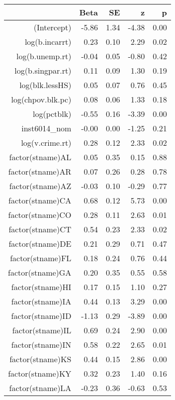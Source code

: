 \begin{table}[ht]
\centering
\begin{tabular}{rrrrr}
  \hline
 & Beta & SE & z & p \\ 
  \hline
(Intercept) & -5.86 & 1.34 & -4.38 & 0.00 \\ 
  log(b.incarrt) & 0.23 & 0.10 & 2.29 & 0.02 \\ 
  log(b.unemp.rt) & -0.04 & 0.05 & -0.80 & 0.42 \\ 
  log(b.singpar.rt) & 0.11 & 0.09 & 1.30 & 0.19 \\ 
  log(blk.lessHS) & 0.05 & 0.07 & 0.76 & 0.45 \\ 
  log(chpov.blk.pc) & 0.08 & 0.06 & 1.33 & 0.18 \\ 
  log(pctblk) & -0.55 & 0.16 & -3.39 & 0.00 \\ 
  inst6014\_nom & -0.00 & 0.00 & -1.25 & 0.21 \\ 
  log(v.crime.rt) & 0.28 & 0.12 & 2.33 & 0.02 \\ 
  factor(stname)AL & 0.05 & 0.35 & 0.15 & 0.88 \\ 
  factor(stname)AR & 0.07 & 0.26 & 0.28 & 0.78 \\ 
  factor(stname)AZ & -0.03 & 0.10 & -0.29 & 0.77 \\ 
  factor(stname)CA & 0.68 & 0.12 & 5.73 & 0.00 \\ 
  factor(stname)CO & 0.28 & 0.11 & 2.63 & 0.01 \\ 
  factor(stname)CT & 0.54 & 0.23 & 2.33 & 0.02 \\ 
  factor(stname)DE & 0.21 & 0.29 & 0.71 & 0.47 \\ 
  factor(stname)FL & 0.18 & 0.24 & 0.76 & 0.44 \\ 
  factor(stname)GA & 0.20 & 0.35 & 0.55 & 0.58 \\ 
  factor(stname)HI & 0.17 & 0.15 & 1.10 & 0.27 \\ 
  factor(stname)IA & 0.44 & 0.13 & 3.29 & 0.00 \\ 
  factor(stname)ID & -1.13 & 0.29 & -3.89 & 0.00 \\ 
  factor(stname)IL & 0.69 & 0.24 & 2.90 & 0.00 \\ 
  factor(stname)IN & 0.58 & 0.22 & 2.65 & 0.01 \\ 
  factor(stname)KS & 0.44 & 0.15 & 2.86 & 0.00 \\ 
  factor(stname)KY & 0.32 & 0.23 & 1.40 & 0.16 \\ 
  factor(stname)LA & -0.23 & 0.36 & -0.63 & 0.53 \\ 

\end{tabular}
\end{table}

